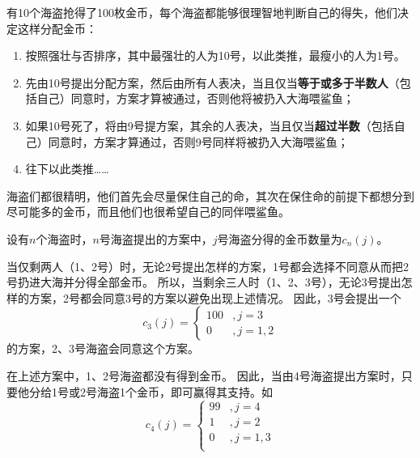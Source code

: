 \documentclass[answers]{exam}
\begin{document}
\begin{questions}
    \newpage %

    \question 有10个海盗抢得了100枚金币，每个海盗都能够很理智地判断自己的得失，他们决定这样分配金币：
    \begin{enumerate}
        \item 按照强壮与否排序，其中最强壮的人为10号，以此类推，最瘦小的人为1号。
        \item 先由10号提出分配方案，然后由所有人表决，当且仅当\textbf{等于或多于半数人}（包括自己）同意时，方案才算被通过，否则他将被扔入大海喂鲨鱼；
        \item 如果10号死了，将由9号提方案，其余的人表决，当且仅当\textbf{超过半数}（包括自己）同意时，方案才算通过，否则9号同样将被扔入大海喂鲨鱼；
        \item 往下以此类推……
    \end{enumerate}
    海盗们都很精明，他们首先会尽量保住自己的命，其次在保住命的前提下都想分到尽可能多的金币，而且他们也很希望自己的同伴喂鲨鱼。



    \begin{solution}
        设有$n$个海盗时，$n$号海盗提出的方案中，$j$号海盗分得的金币数量为$c_n(j)$。

        当仅剩两人（1、2号）时，无论2号提出怎样的方案，1号都会选择不同意从而把2号扔进大海并分得全部金币。
        所以，当剩余三人时（1、2、3号），无论3号提出怎样的方案，2号都会同意3号的方案以避免出现上述情况。
        因此，3号会提出一个$$
            c_3(j) = \begin{cases}
                100 & , j=3   \\
                0   & , j=1,2
            \end{cases}
        $$的方案，2、3号海盗会同意这个方案。

        在上述方案中，1、2号海盗都没有得到金币。
        因此，当由4号海盗提出方案时，只要他分给1号或2号海盗1个金币，即可赢得其支持。如$$
            c_4(j) = \begin{cases}
                99 & , j=4   \\
                1  & , j=2   \\
                0  & , j=1,3 \\
            \end{cases}
        $$


\end{solution}
\end{questions}
\end{document}
